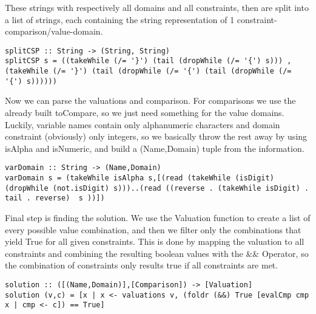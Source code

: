 \documentclass[a4paper,11pt]{article}
\begin{document}
 These strings with respectively all domains and all constraints, then are split into a list of strings, each containing the string representation of 1 constraint-comparison/value-domain.
 
\begin{lstlisting}
splitCSP :: String -> (String, String)
splitCSP s = ((takeWhile (/= '}') (tail (dropWhile (/= '{') s))) , (takeWhile (/= '}') (tail (dropWhile (/= '{') (tail (dropWhile (/= '{') s))))))
\end{lstlisting}
 
 Now we can parse the valuations and comparison. For comparisons we use the already built toCompare, so we just need something for the value domains. Luckily, variable names contain only alphanumeric characters and domain constraint (obviously) only integers, so we basically throw the rest away by using isAlpha and isNumeric, and build a (Name,Domain) tuple from the information.
 
\begin{lstlisting}
varDomain :: String -> (Name,Domain)
varDomain s = (takeWhile isAlpha s,[(read (takeWhile (isDigit) (dropWhile (not.isDigit) s)))..(read ((reverse . (takeWhile isDigit) . tail . reverse)  s ))])
\end{lstlisting}
 
 Final step is finding the solution. We use the Valuation function to create a list of every possible value combination, and then we filter only the combinations that yield True for all given constraints. This is done by mapping the valuation to all constraints and combining the resulting boolean values with the \&\& Operator, so the combination of constraints only results true if all constraints are met.

\begin{lstlisting}
solution :: ([(Name,Domain)],[Comparison]) -> [Valuation]
solution (v,c) = [x | x <- valuations v, (foldr (&&) True [evalCmp cmp x | cmp <- c]) == True]
\end{lstlisting}
\end{document}
